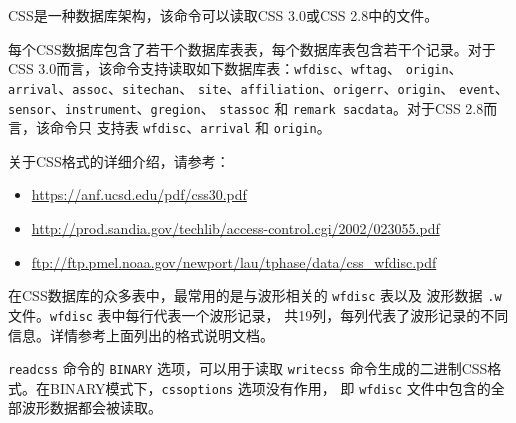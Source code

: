 CSS是一种数据库架构，该命令可以读取CSS 3.0或CSS 2.8中的文件。

每个CSS数据库包含了若干个数据库表表，每个数据库表包含若干个记录。对于
CSS 3.0而言，该命令支持读取如下数据库表：\texttt{wfdisc}、\texttt{wftag}、
\texttt{origin}、\texttt{arrival}、\texttt{assoc}、\texttt{sitechan}、
\texttt{site}、\texttt{affiliation}、\texttt{origerr}、\texttt{origin}、
\texttt{event}、\texttt{sensor}、\texttt{instrument}、\texttt{gregion}、
\texttt{stassoc} 和 \texttt{remark sacdata}。对于CSS 2.8而言，该命令只
支持表 \texttt{wfdisc}、\texttt{arrival} 和 \texttt{origin}。

关于CSS格式的详细介绍，请参考：
\begin{itemize}
\item \url{https://anf.ucsd.edu/pdf/css30.pdf}
\item \url{http://prod.sandia.gov/techlib/access-control.cgi/2002/023055.pdf}
\item \url{ftp://ftp.pmel.noaa.gov/newport/lau/tphase/data/css_wfdisc.pdf}
\end{itemize}

在CSS数据库的众多表中，最常用的是与波形相关的 \texttt{wfdisc} 表以及
波形数据 \texttt{.w} 文件。\texttt{wfdisc} 表中每行代表一个波形记录，
共19列，每列代表了波形记录的不同信息。详情参考上面列出的格式说明文档。

\texttt{readcss} 命令的 \texttt{BINARY} 选项，可以用于读取 \texttt{writecss}
命令生成的二进制CSS格式。在BINARY模式下，\texttt{cssoptions} 选项没有作用，
即 \texttt{wfdisc} 文件中包含的全部波形数据都会被读取。
